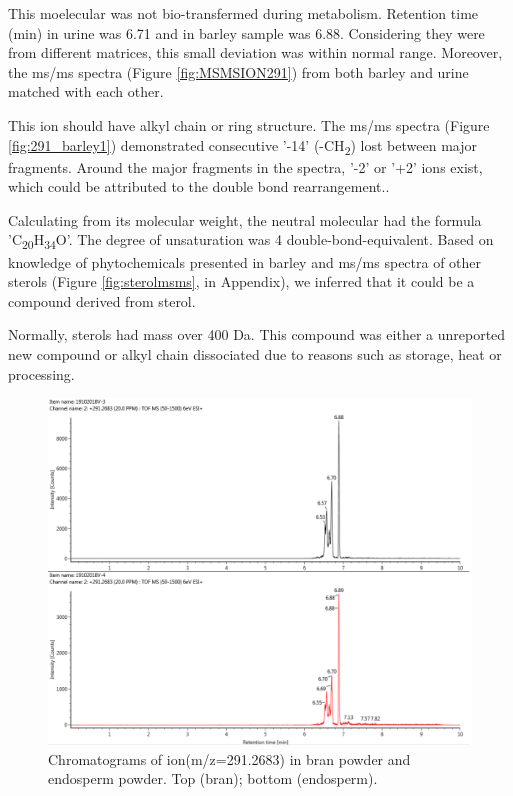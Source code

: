 This moelecular was not bio-transfermed during metabolism. Retention time (min) in urine was 6.71 and in barley sample was 6.88. Considering they were from different matrices, this small deviation was within normal range. Moreover, the \acrshort{ms/ms} spectra (Figure \ref{fig:MSMSION291}) from both barley and urine matched with each other.

This ion should have alkyl chain or ring structure. The \acrshort{ms/ms} spectra (Figure \ref{fig:291_barley1}) demonstrated consecutive '-14' (-CH\textsubscript{2}) lost between major fragments. Around the major fragments in the spectra, '-2' or '+2' ions exist, which could be attributed to the double bond rearrangement..

Calculating from its molecular weight, the neutral molecular had the formula 'C\textsubscript{20}H\textsubscript{34}O'.
The degree of unsaturation was 4 double-bond-equivalent.
Based on knowledge of phytochemicals presented in barley\cite{Idehen2017} and \acrshort{ms/ms} spectra of other sterols (Figure \ref{fig:sterolmsms}, in Appendix), we inferred that it could be a compound derived from sterol. 

Normally, sterols had mass over 400 Da. This compound was either a unreported new compound or alkyl chain dissociated due to reasons such as storage, heat or processing.

\begin{figure}[H]
    \centering
    \includegraphics[scale=0.42]{images/291pos(p1,p2).png}
    \caption{Chromatograms of ion(m/z=291.2683) in bran powder and endosperm powder. Top (bran); bottom (endosperm).}
    \label{fig:291_barley}
\end{figure}

